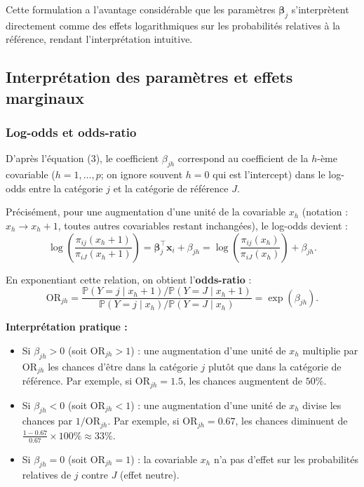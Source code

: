\documentclass[12pt,a4paper]{article}
\begin{document}
Cette formulation a l'avantage considérable que les paramètres $\boldsymbol{\beta}_j$ s'interprètent directement comme des effets logarithmiques sur les probabilités relatives à la référence, rendant l'interprétation intuitive.

\subsection{Interprétation des paramètres et effets marginaux}

\subsubsection{Log-odds et odds-ratio}

D'après l'équation (3), le coefficient $\beta_{jh}$ correspond au coefficient de la $h$-ème covariable ($h = 1, \ldots, p$; on ignore souvent $h=0$ qui est l'intercept) dans le log-odds entre la catégorie $j$ et la catégorie de référence $J$.

Précisément, pour une augmentation d'une unité de la covariable $x_h$ (notation : $x_h \to x_h + 1$, toutes autres covariables restant inchangées), le log-odds devient :
\begin{equation}
\log\left(\frac{\pi_{ij}(x_h+1)}{\pi_{iJ}(x_h+1)}\right) = \boldsymbol{\beta}_j^\top \mathbf{x}_i + \beta_{jh} = \log\left(\frac{\pi_{ij}(x_h)}{\pi_{iJ}(x_h)}\right) + \beta_{jh}.
\end{equation}

En exponentiant cette relation, on obtient l'\textbf{odds-ratio} :
\begin{equation}\label{eq:oddsratio}
\text{OR}_{jh} = \frac{\mathbb{P}(Y=j \mid x_h+1) / \mathbb{P}(Y=J \mid x_h+1)}{\mathbb{P}(Y=j \mid x_h) / \mathbb{P}(Y=J \mid x_h)} = \exp(\beta_{jh}).
\end{equation}

\textbf{Interprétation pratique :}
\begin{itemize}
    \item Si $\beta_{jh} > 0$ (soit $\text{OR}_{jh} > 1$) : une augmentation d'une unité de $x_h$ multiplie par $\text{OR}_{jh}$ les chances d'être dans la catégorie $j$ plutôt que dans la catégorie de référence. Par exemple, si $\text{OR}_{jh} = 1.5$, les chances augmentent de $50\%$.
    
    \item Si $\beta_{jh} < 0$ (soit $\text{OR}_{jh} < 1$) : une augmentation d'une unité de $x_h$ divise les chances par $1 / \text{OR}_{jh}$. Par exemple, si $\text{OR}_{jh} = 0.67$, les chances diminuent de $\frac{1 - 0.67}{0.67} \times 100 \% \approx 33\%$.
    
    \item Si $\beta_{jh} = 0$ (soit $\text{OR}_{jh} = 1$) : la covariable $x_h$ n'a pas d'effet sur les probabilités relatives de $j$ contre $J$ (effet neutre).
\end{itemize}
\end{document}
